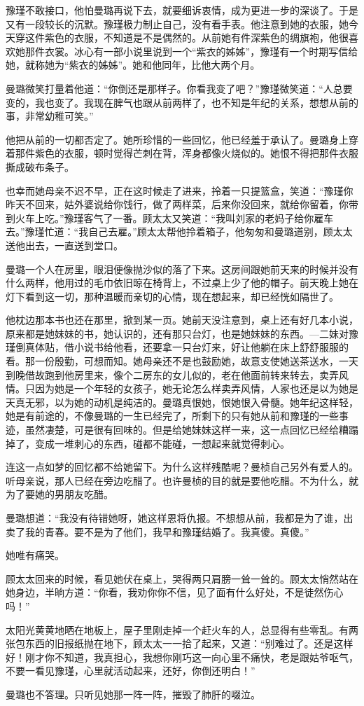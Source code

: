 \par 豫瑾不敢接口，他怕曼璐再说下去，就要细诉衷情，成为更进一步的深谈了。于是又有一段较长的沉默。豫瑾极力制止自己，没有看手表。他注意到她的衣服，她今天穿这件紫色的衣服，不知道是不是偶然的。从前她有件深紫色的绸旗袍，他很喜欢她那件衣裳。冰心有一部小说里说到一个“紫衣的姊姊”，豫瑾有一个时期写信给她，就称她为“紫衣的姊姊”。她和他同年，比他大两个月。
\par 曼璐微笑打量着他道：“你倒还是那样子。你看我变了吧？”豫瑾微笑道：“人总要变的，我也变了。我现在脾气也跟从前两样了，也不知是年纪的关系，想想从前的事，非常幼稚可笑。”
\par 他把从前的一切都否定了。她所珍惜的一些回忆，他已经羞于承认了。曼璐身上穿着那件紫色的衣服，顿时觉得芒刺在背，浑身都像火烧似的。她恨不得把那件衣服撕成破布条子。
\par 也幸而她母亲不迟不早，正在这时候走了进来，拎着一只提篮盒，笑道：“豫瑾你昨天不回来，姑外婆说给你饯行，做了两样菜，后来你没回来，就给你留着，你带到火车上吃。”豫瑾客气了一番。顾太太又笑道：“我叫刘家的老妈子给你雇车去。”豫瑾忙道：“我自己去雇。”顾太太帮他拎着箱子，他匆匆和曼璐道别，顾太太送他出去，一直送到堂口。
\par 曼璐一个人在房里，眼泪便像抛沙似的落了下来。这房间跟她前天来的时候并没有什么两样，他用过的毛巾依旧晾在椅背上，不过桌上少了他的帽子。前天晚上她在灯下看到这一切，那种温暖而亲切的心情，现在想起来，却已经恍如隔世了。
\par 他枕边那本书也还在那里，掀到某一页。她前天没注意到，桌上还有好几本小说，原来都是她妹妹的书，她认识的，还有那只台灯，也是她妹妹的东西。—二妹对豫瑾倒真体贴，借小说书给他看，还要拿一只台灯来，好让他躺在床上舒舒服服的看。那一份殷勤，可想而知。她母亲还不是也鼓励她，故意支使她送茶送水，一天到晚借故跑到他房里来，像个二房东的女儿似的，老在他面前转来转去，卖弄风情。只因为她是一个年轻的女孩子，她无论怎么样卖弄风情，人家也还是以为她是天真无邪，以为她的动机是纯洁的。曼璐真恨她，恨她恨入骨髓。她年纪这样轻，她是有前途的，不像曼璐的一生已经完了，所剩下的只有她从前和豫瑾的一些事迹，虽然凄楚，可是很有回味的。但是给她妹妹这样一来，这一点回忆已经给糟蹋掉了，变成一堆刺心的东西，碰都不能碰，一想起来就觉得刺心。
\par 连这一点如梦的回忆都不给她留下。为什么这样残酷呢？曼桢自己另外有爱人的。听母亲说，那人已经在旁边吃醋了。也许曼桢的目的就是要他吃醋。不为什么，就为了要她的男朋友吃醋。
\par 曼璐想道：“我没有待错她呀，她这样恩将仇报。不想想从前，我都是为了谁，出卖了我的青春。要不是为了他们，我早和豫瑾结婚了。我真傻。真傻。”
\par 她唯有痛哭。
\par 顾太太回来的时候，看见她伏在桌上，哭得两只肩膀一耸一耸的。顾太太悄然站在她身边，半晌方道：“你看，我劝你你不信，见了面有什么好处，不是徒然伤心吗！”
\par 太阳光黄黄地晒在地板上，屋子里刚走掉一个赶火车的人，总显得有些零乱。有两张包东西的旧报纸抛在地下，顾太太一一拾了起来，又道：“别难过了。还是这样好！刚才你不知道，我真担心，我想你刚巧这一向心里不痛快，老是跟姑爷呕气，不要一看见豫瑾，心里就活动起来，还好，你倒还明白！”
\par 曼璐也不答理。只听见她那一阵一阵，摧毁了肺肝的啜泣。


